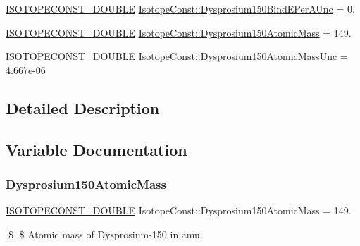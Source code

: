 \begin{DoxyCompactItemize}
\mbox{\hyperlink{group___isotope_const-_macros_ga8f45a7272ce02c0b4c65c44636ed719a}{I\+S\+O\+T\+O\+P\+E\+C\+O\+N\+S\+T\+\_\+\+D\+O\+U\+B\+LE}} \mbox{\hyperlink{group___isotope_const-_dysprosium-_dy150_gaf11e54a633d7e712bf603641bef69004}{Isotope\+Const\+::\+Dysprosium150\+Bind\+E\+Per\+A\+Unc}} = 0.
\item 
\mbox{\hyperlink{group___isotope_const-_macros_ga8f45a7272ce02c0b4c65c44636ed719a}{I\+S\+O\+T\+O\+P\+E\+C\+O\+N\+S\+T\+\_\+\+D\+O\+U\+B\+LE}} \mbox{\hyperlink{group___isotope_const-_dysprosium-_dy150_ga0ef4daac8d596527d7044156666d83c5}{Isotope\+Const\+::\+Dysprosium150\+Atomic\+Mass}} = 149.
\item 
\mbox{\hyperlink{group___isotope_const-_macros_ga8f45a7272ce02c0b4c65c44636ed719a}{I\+S\+O\+T\+O\+P\+E\+C\+O\+N\+S\+T\+\_\+\+D\+O\+U\+B\+LE}} \mbox{\hyperlink{group___isotope_const-_dysprosium-_dy150_ga52ad5d4f553b854d6af0907053fea83e}{Isotope\+Const\+::\+Dysprosium150\+Atomic\+Mass\+Unc}} = 4.\+667e-\/06
\end{DoxyCompactItemize}


\subsection{Detailed Description}


\subsection{Variable Documentation}
\mbox{\label{group___isotope_const-_dysprosium-_dy150_ga0ef4daac8d596527d7044156666d83c5}} 
\subsubsection{\texorpdfstring{Dysprosium150\+Atomic\+Mass}{Dysprosium150AtomicMass}}
{\footnotesize\ttfamily \mbox{\hyperlink{group___isotope_const-_macros_ga8f45a7272ce02c0b4c65c44636ed719a}{I\+S\+O\+T\+O\+P\+E\+C\+O\+N\+S\+T\+\_\+\+D\+O\+U\+B\+LE}} Isotope\+Const\+::\+Dysprosium150\+Atomic\+Mass = 149.}

\$ \$ Atomic mass of Dysprosium-\/150 in amu. \mbox{\label{group___isotope_const-_dysprosium-_dy150_ga52ad5d4f553b854d6af0907053fea83e}} 
